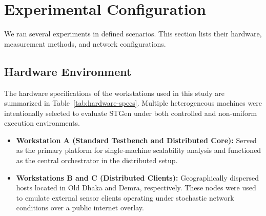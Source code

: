 \documentclass[jsan,article,submit,moreauthors,pdftex]{Definitions/mdpi}
\begin{document}
\section{Experimental Configuration}
\label{sec:setup}

We ran several experiments in defined scenarios. This section lists their hardware, measurement methods, and network configurations.

\subsection{Hardware Environment}
The hardware specifications of the workstations used in this study are summarized in Table~\ref{tab:hardware-specs}. Multiple heterogeneous machines were intentionally selected to evaluate STGen under both controlled and non-uniform execution environments.

\begin{itemize} 
    \item \textbf{Workstation A (Standard Testbench and Distributed Core):} Served as the primary platform for single-machine scalability analysis and functioned as the central orchestrator in the distributed setup. 
    \item \textbf{Workstations B and C (Distributed Clients):} Geographically dispersed hosts located in Old Dhaka and Demra, respectively. These nodes were used to emulate external sensor clients operating under stochastic network conditions over a public internet overlay. \end{itemize}


\end{document}
